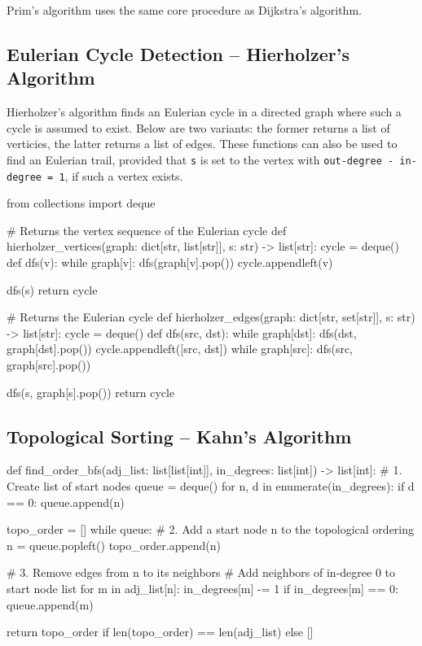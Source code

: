 \documentclass[12pt, titlepage]{article}
\begin{document}
Prim's algorithm uses the same core procedure as Dijkstra's algorithm.

\subsection{Eulerian Cycle Detection -- Hierholzer's Algorithm} \label{hierholzer}

Hierholzer's algorithm finds an Eulerian cycle in a directed graph where such a cycle is assumed to exist. Below are two variants: the former returns a list of verticies, the latter returns a list of edges. These functions can also be used to find an Eulerian trail, provided that \texttt{s} is set to the vertex with \texttt{out-degree - in-degree = 1}, if such a vertex exists. \medskip

\begin{python}
from collections import deque

# Returns the vertex sequence of the Eulerian cycle
def hierholzer_vertices(graph: dict[str, list[str]], s: str) -> list[str]:
    cycle = deque()
    def dfs(v):
        while graph[v]:
            dfs(graph[v].pop())
        cycle.appendleft(v)

    dfs(s)
    return cycle


# Returns the Eulerian cycle
def hierholzer_edges(graph: dict[str, set[str]], s: str) -> list[str]:
    cycle = deque()
    def dfs(src, dst):
        while graph[dst]:
            dfs(dst, graph[dst].pop())
        cycle.appendleft([src, dst])
        while graph[src]:
            dfs(src, graph[src].pop())

    dfs(s, graph[s].pop())
    return cycle
\end{python}

\subsection{Topological Sorting -- Kahn's Algorithm} \label{kahn}
\begin{python}
def find_order_bfs(adj_list: list[list[int]],
                   in_degrees: list[int]) -> list[int]:
    # 1. Create list of start nodes
    queue = deque()
    for n, d in enumerate(in_degrees):
        if d == 0:
            queue.append(n)

    topo_order = []
    while queue:
        # 2. Add a start node n to the topological ordering
        n = queue.popleft()
        topo_order.append(n)

        # 3. Remove edges from n to its neighbors
        #    Add neighbors of in-degree 0 to start node list
        for m in adj_list[n]:
            in_degrees[m] -= 1
            if in_degrees[m] == 0:
                queue.append(m)

    return topo_order if len(topo_order) == len(adj_list) else []
\end{python}
\end{document}
